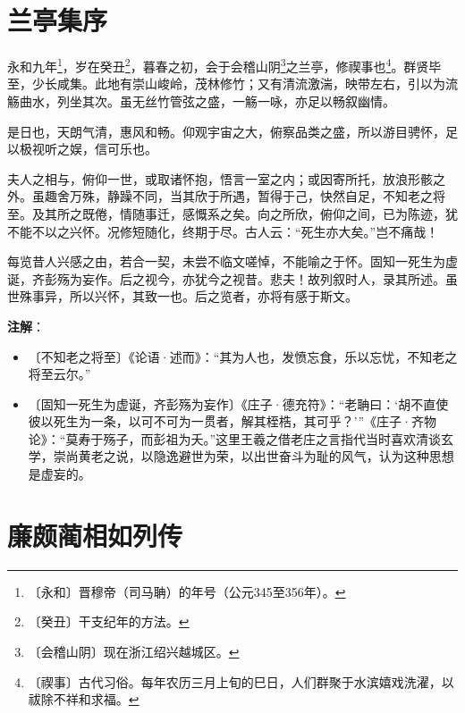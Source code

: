 \documentclass[12pt,UTF-8,openany]{ctexbook}
\begin{document}
\chapter{兰亭集序}

\begin{normalsize}
    
    永和九年\footnote{〔永和〕晋穆帝（司马聃）的年号（公元345至356年）。}，岁在癸丑\footnote{〔癸丑〕干支纪年的方法。}，暮春之初，会于会稽山阴\footnote{〔会稽山阴〕现在浙江绍兴越城区。}之兰亭，修禊事也\footnote{〔禊事〕古代习俗。每年农历三月上旬的巳日，人们群聚于水滨嬉戏洗濯，以祓除不祥和求福。}。群贤毕至，少长咸集。此地有崇山峻岭，茂林修竹；又有清流激湍，映带左右，引以为流觞曲水，列坐其次。虽无丝竹管弦之盛，一觞一咏，亦足以畅叙幽情。
    
    是日也，天朗气清，惠风和畅。仰观宇宙之大，俯察品类之盛，所以游目骋怀，足以极视听之娱，信可乐也。
    
    夫人之相与，俯仰一世，或取诸怀抱，悟言一室之内；或因寄所托，放浪形骸之外。虽趣舍万殊，静躁不同，当其欣于所遇，暂得于己，快然自足，不知老之将至。及其所之既倦，情随事迁，感慨系之矣。向之所欣，俯仰之间，已为陈迹，犹不能不以之兴怀。况修短随化，终期于尽。古人云：“死生亦大矣。”岂不痛哉！
    
    每览昔人兴感之由，若合一契，未尝不临文嗟悼，不能喻之于怀。固知一死生为虚诞，齐彭殇为妄作。后之视今，亦犹今之视昔。悲夫！故列叙时人，录其所述。虽世殊事异，所以兴怀，其致一也。后之览者，亦将有感于斯文。
\end{normalsize}


\newpage

\textbf{注解}：

\vspace{-1em}

\begin{itemize}
    \setlength\itemsep{-0.2em}
    \item〔不知老之将至〕《论语·述而》：“其为人也，发愤忘食，乐以忘忧，不知老之将至云尔。”
    \item〔固知一死生为虚诞，齐彭殇为妄作〕《庄子·德充符》：“老聃曰：‘胡不直使彼以死生为一条，以可不可为一贯者，解其桎梏，其可乎？’”《庄子·齐物论》：“莫寿于殇子，而彭祖为夭。”这里王羲之借老庄之言指代当时喜欢清谈玄学，崇尚黄老之说，以隐逸避世为荣，以出世奋斗为耻的风气，认为这种思想是虚妄的。
\end{itemize}

\chapter{廉颇蔺相如列传}
\end{document}
